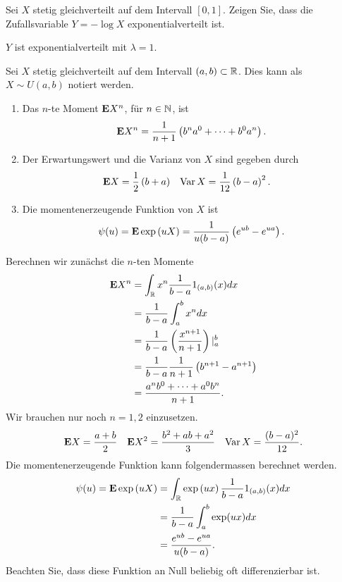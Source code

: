  Sei $X$ stetig
gleichverteilt auf dem Intervall $[0,1]$. Zeigen Sie, dass die Zufallsvariable $Y
= -\log X$ exponentialverteilt ist.

\solution $Y$ ist exponentialverteilt mit $\lambda=1$.


Sei $X$ stetig gleichverteilt auf dem Intervall $\left( a,b \right)\subset \mathbb R$.  
Dies kann als $X \sim U(a,b)$ notiert werden. 
\begin{enumerate}
    \item Das $n$-te Moment $\mathbf{E} X^{n}$, für $n\in\mathbb N$, ist 
        \begin{equation*}
            \mathbf{E} X^n = \frac{1}{n+1}\left( b^{n}a^0 + \cdots + b^{0}a^{n} \right).
        \end{equation*}
    \item Der Erwartungswert und die Varianz von $X$ sind gegeben durch
        \begin{align*}
            \mathbf{E} X    & = \frac{1}{2} \left( b+a \right) & 
            \operatorname{Var} X  & = \frac{1}{12} \left( b-a \right)^{2}.  
        \end{align*}
    \item Die momentenerzeugende Funktion von $X$ ist 
        \begin{equation*}
            \psi(u) = \mathbf{E} \exp \left( u X \right) = \frac{1}{u(b-a)}\left( e^{ub} - e^{ua} \right).
        \end{equation*}
\end{enumerate}

\solution Berechnen wir zunächst die $n$-ten Momente
\begin{align*}
    \mathbf{E} X^n &= \int_{\mathbb R}^{} x^n \frac{1}{b-a} 1_{(a,b)}(x) dx \\
    &= \frac{1}{b-a} \int_{a}^{b} x^n dx \\
    &= \frac{1}{b-a} \left( \frac{x^{n+1}}{n+1} \right) |_{a}^{b} \\
    &= \frac{1}{b-a}\frac{1}{n+1} \left( b^{n+1}-a^{n+1} \right) \\
    &= \frac{a^n b^{0} +\cdots+ a^0 b^{n}}{n+1}.
\end{align*}
Wir brauchen nur noch $n=1,2$ einzusetzen.
\begin{align*}
    \mathbf{E} X &= \frac{a+b}{2} & \mathbf{E} X^2 &= \frac{b^2 + ab + a^2}{3} & 
    \operatorname{Var} X = \frac{(b-a)^2}{12}.
\end{align*}
Die momentenerzeugende Funktion kann folgendermassen berechnet werden. 
\begin{align*}
    \psi(u) = \mathbf{E} \exp\left( uX \right) &= 
    \int_{\mathbb R} \exp \left( ux \right) \frac{1}{b-a} 1_{(a,b)}(x) dx \\
    &= \frac{1}{b-a} \int_{a}^{b} \exp (ux) dx \\
    &= \frac{e^{ub}-e^{ua}}{u(b-a)}.
\end{align*}
Beachten Sie, dass diese Funktion an Null beliebig oft differenzierbar ist. 


